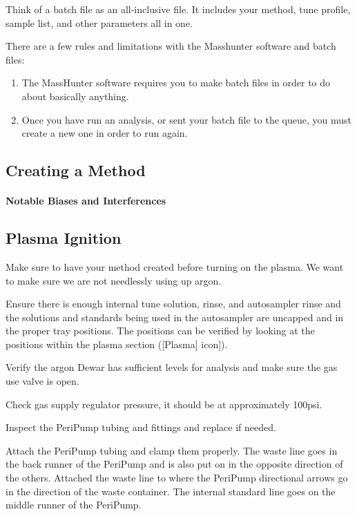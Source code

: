 \documentclass[12pt]{../SOP4_alpha}\usepackage[]{graphicx}\usepackage[]{color}
\begin{document}
\NP Think of a batch file as an all-inclusive file. It includes your method, tune profile, sample list, and other parameters all in one.

\NP There are a few rules and limitations with the Masshunter software and batch files:

\begin{enumerate}
\item The MassHunter software requires you to make batch files in order to do about basically anything.
\item Once you have run an analysis, or sent your batch file to the queue, you must create a new one in order to run again.
\end{enumerate}

\subsection{Creating a Method}

\paragraph{Notable Biases and Interferences}

\subsection{Plasma Ignition}

\NP Make sure to have your method created before turning on the plasma. We want to make sure we are not needlessly using up argon.

\NP Ensure there is enough internal tune solution, rinse, and autosampler rinse and the solutions and standards being used in the autosampler are uncapped and in the proper tray positions. The positions can be verified by looking at the positions within the plasma section ([Plasma] icon]).

\NP Verify the argon Dewar has sufficient levels for analysis and make sure the gas use valve is open.

\NP Check gas supply regulator pressure, it should be at approximately 100psi.

\NP Inspect the PeriPump tubing and fittings and replace if needed.

\NP Attach the PeriPump tubing and clamp them properly. The waste line goes in the back runner of the PeriPump and is also put on in the opposite direction of the others. Attached the waste line to where the PeriPump directional arrows go in the direction of the waste container. The internal standard line goes on the middle runner of the PeriPump. 
\end{document}
